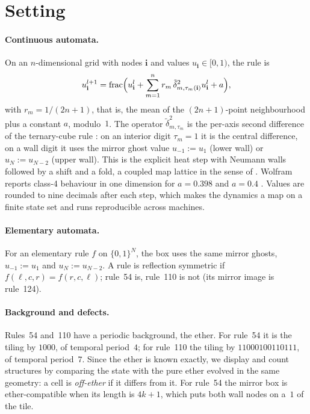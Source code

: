 \documentclass[11pt,a4paper]{article}
\theoremstyle{definition}
\theoremstyle{remark}
\newcommand{\frc}{\operatorname{frac}}
\begin{document}
\section{Setting}\label{sec:setting}

\paragraph{Continuous automata.} On an $n$-dimensional grid with nodes
$\mathbf i$ and values $u_{\mathbf i}\in[0,1)$, the rule is
\begin{equation}\label{eq:cca}
  u^{l+1}_{\mathbf i}=\frc\Bigl(u^l_{\mathbf i}+\sum_{m=1}^nr_m\,\tilde\delta^2_{m,\tau_m(\mathbf i)}u^l_{\mathbf i}+a\Bigr),
\end{equation}
with $r_m=1/(2n+1)$, that is, the mean of the $(2n+1)$-point
neighbourhood plus a constant $a$, modulo~$1$. The operator
$\tilde\delta^2_{m,\tau_m}$ is the per-axis second difference of the
ternary-cube rule \cite{TernaryCube}: on an interior digit $\tau_m=1$ it
is the central difference, on a wall digit it uses the mirror ghost
value $u_{-1}:=u_{1}$ (lower wall) or $u_{N}:=u_{N-2}$ (upper wall).
This is the explicit heat step with Neumann walls followed by a shift and
a fold, a coupled map lattice in the sense of \cite{Kaneko}. Wolfram
reports class-4 behaviour in one dimension for $a=0.398$ and $a=0.4$
\cite[p.~244]{NKS}. Values are rounded to nine decimals after each step,
which makes the dynamics a map on a finite state set and runs
reproducible across machines.

\paragraph{Elementary automata.} For an elementary rule $f$ on
$\{0,1\}^N$, the box uses the same mirror ghosts, $u_{-1}:=u_1$ and
$u_N:=u_{N-2}$. A rule is reflection symmetric if
$f(\ell,c,r)=f(r,c,\ell)$; rule~54 is, rule~110 is not (its mirror image
is rule~124).

\paragraph{Background and defects.} Rules~54 and~110 have a periodic
background, the ether. For rule~54 it is the tiling by $1000$, of
temporal period~$4$; for rule~110 the tiling by $11000100110111$, of
temporal period~$7$. Since the ether is known exactly, we display and
count structures by comparing the state with the pure ether evolved in
the same geometry: a cell is \emph{off-ether} if it differs from it. For
rule~54 the mirror box is ether-compatible when its length is $4k+1$,
which puts both wall nodes on a~$1$ of the tile.
\end{document}
